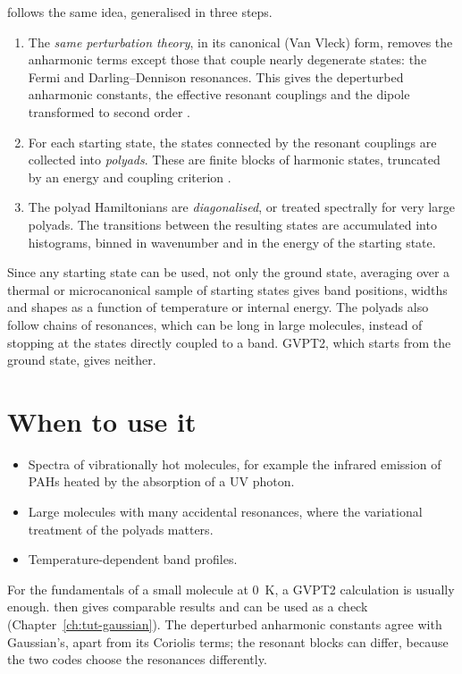 \ac{} follows the same idea, generalised in three steps.
\begin{enumerate}
\item The \emph{same perturbation theory}, in its canonical (Van Vleck)
  form, removes the anharmonic terms except those that couple nearly
  degenerate states: the Fermi and Darling--Dennison resonances. This gives
  the deperturbed anharmonic constants, the effective resonant couplings
  and the dipole transformed to second order .
\item For each starting state, the states connected by the resonant
  couplings are collected into \emph{polyads}. These are finite blocks of
  harmonic states, truncated by an energy and coupling criterion
  .
\item The polyad Hamiltonians are \emph{diagonalised}, or treated
  spectrally for very large polyads. The transitions between the resulting
  states are accumulated into histograms, binned in wavenumber and in the
  energy of the starting state.
\end{enumerate}
Since any starting state can be used, not only the ground state, averaging
over a thermal or microcanonical sample of starting states gives band
positions, widths and shapes as a function of temperature or internal
energy. The polyads also follow chains of resonances, which can be long
in large molecules, instead of stopping at the states directly coupled
to a band. GVPT2, which starts from the ground state, gives neither.

\section{When to use it}

\begin{itemize}
\item Spectra of vibrationally hot molecules, for example the infrared
  emission of PAHs heated by the absorption of a UV photon.
\item Large molecules with many accidental resonances, where the
  variational treatment of the polyads matters.
\item Temperature-dependent band profiles.
\end{itemize}
For the fundamentals of a small molecule at 0~K, a GVPT2 calculation is
usually enough. \ac{} then gives comparable results and can be used as a
check (Chapter~\ref{ch:tut-gaussian}). The deperturbed anharmonic constants
agree with Gaussian's, apart from its Coriolis terms; the resonant blocks
can differ, because the two codes choose the resonances differently.

